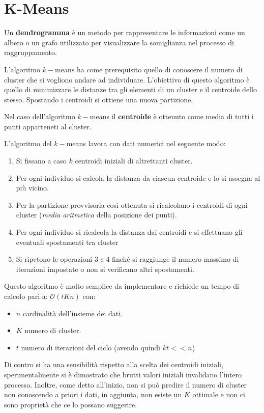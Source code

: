 \section{K-Means}
\begin{definizione}
    Un \textbf{dendrogramma} è un metodo per rappresentare le informazioni come
    un albero o un grafo utilizzato per visualizzare la somiglianza nel processo
    di raggruppamento.
\end{definizione}
L'algoritmo $k-$means ha come prerequisito quello di conoscere il numero di cluster
che si vogliono andare ad individuare. L'obiettivo di questo algoritmo è quello
di minimizzare le distanze tra gli elementi di un cluster e il centroide dello stesso.
Spostando i centroidi si ottiene una nuova partizione.
\begin{definizione}
    Nel caso dell'algoritmo $k-$means il \textbf{centroide} è ottenuto come media
    di tutti i punti apparteneti al cluster.
\end{definizione}
L'algoritmo del $k-$means lavora con dati numerici nel seguente modo:
\begin{enumerate}
    \item Si fissano a caso $k$ centroidi iniziali di altrettanti cluster.
    \item Per ogni individuo si calcola la distanza da ciascun centroide e lo si
          assegna al più vicino.
    \item Per la partizione provvisoria così ottenuta si ricalcolano i centroidi
          di ogni cluster (\textit{media aritmetica} della posizione dei punti).
    \item Per ogni individuo si ricalcola la distanza dai centroidi e si effettuano
          gli eventuali spostamenti tra cluster
    \item Si ripetono le operazioni 3 e 4 finché si raggiunge il numero massimo
          di iterazioni impostate o non si verificano altri spostamenti.
\end{enumerate}
Questo algoritmo è molto semplice da implementare e richiede un tempo di calcolo
pari a: $\mathcal{O}(tKn)$ con:
\begin{itemize}
    \item $n$ cardinalità dell'insieme dei dati.
    \item $K$ numero di cluster.
    \item $t$ numero di iterazioni del ciclo (avendo quindi $kt << n$)
\end{itemize}
Di contro si ha una sensibilità rispetto alla scelta dei centroidi iniziali,
sperimentalmente si è dimostrato che brutti valori iniziali invalidano l'intero
processo. Inoltre, come detto all'inizio, non si può predire il numero di cluster
non conoscendo a priori i dati, in aggiunta, non esiste un $K$ ottimale e non ci
sono proprietà che ce lo possano suggerire.

